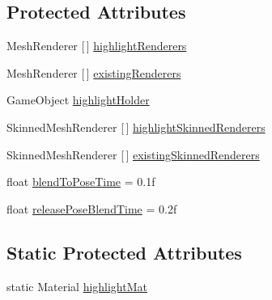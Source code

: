 \subsection*{Protected Attributes}
\begin{DoxyCompactItemize}
\item 
Mesh\+Renderer \mbox{[}$\,$\mbox{]} \mbox{\hyperlink{class_valve_1_1_v_r_1_1_interaction_system_1_1_interactable_a4419695933e79ee0fcc09e8640033c77}{highlight\+Renderers}}
\item 
Mesh\+Renderer \mbox{[}$\,$\mbox{]} \mbox{\hyperlink{class_valve_1_1_v_r_1_1_interaction_system_1_1_interactable_aff2b9c4512966aea11163897ae0bee4c}{existing\+Renderers}}
\item 
Game\+Object \mbox{\hyperlink{class_valve_1_1_v_r_1_1_interaction_system_1_1_interactable_a644001123a5b130b174d1bebc7b348ee}{highlight\+Holder}}
\item 
Skinned\+Mesh\+Renderer \mbox{[}$\,$\mbox{]} \mbox{\hyperlink{class_valve_1_1_v_r_1_1_interaction_system_1_1_interactable_a4a0a9489cbfb6f6f4bb12deb9ebe3f30}{highlight\+Skinned\+Renderers}}
\item 
Skinned\+Mesh\+Renderer \mbox{[}$\,$\mbox{]} \mbox{\hyperlink{class_valve_1_1_v_r_1_1_interaction_system_1_1_interactable_a7027b7be7cfb777e96ee8cda85c42cfc}{existing\+Skinned\+Renderers}}
\item 
float \mbox{\hyperlink{class_valve_1_1_v_r_1_1_interaction_system_1_1_interactable_aa12eafae403f08c79b7c6da56e4258cb}{blend\+To\+Pose\+Time}} = 0.\+1f
\item 
float \mbox{\hyperlink{class_valve_1_1_v_r_1_1_interaction_system_1_1_interactable_afcc8f08198ce95e8da914f46cb836fe0}{release\+Pose\+Blend\+Time}} = 0.\+2f
\end{DoxyCompactItemize}
\subsection*{Static Protected Attributes}
\begin{DoxyCompactItemize}
\item 
static Material \mbox{\hyperlink{class_valve_1_1_v_r_1_1_interaction_system_1_1_interactable_ad3324bd529fcdcc13f276bf7de59e3d9}{highlight\+Mat}}
\end{DoxyCompactItemize}
